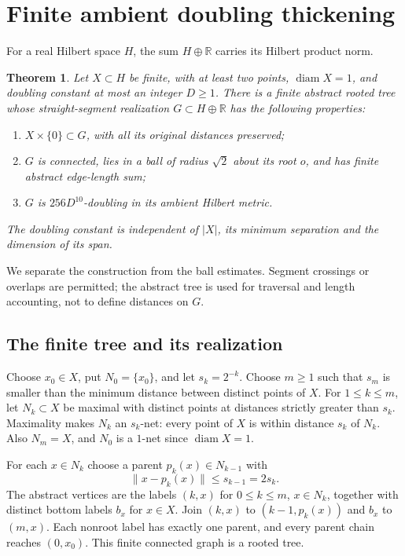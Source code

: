 \documentclass[11pt,a4paper]{article}
\newtheorem{theorem}{Theorem}[section]
\theoremstyle{definition}
\theoremstyle{remark}
\numberwithin{equation}{section}
\newcommand{\R}{\mathbb R}
\newcommand{\norm}[1]{\lVert #1\rVert}
\newcommand{\diam}{\operatorname{diam}}
\begin{document}
\section{Finite ambient doubling thickening}\label{sec:thickening}
For a real Hilbert space $H$, the sum $H\oplus\R$ carries its Hilbert product norm.
\begin{theorem}\label{thm:finite}
Let $X\subset H$ be finite, with at least two points, $\diam X=1$, and doubling constant at most an integer $D\ge1$. There is a finite abstract rooted tree whose straight-segment realization $G\subset H\oplus\R$ has the following properties:
\begin{enumerate}
\item $X\times\{0\}\subset G$, with all its original distances preserved;
\item $G$ is connected, lies in a ball of radius $\sqrt2$ about its root $o$, and has finite abstract edge-length sum;
\item $G$ is $256D^{10}$-doubling in its ambient Hilbert metric.
\end{enumerate}
The doubling constant is independent of $|X|$, its minimum separation and the dimension of its span.
\end{theorem}
We separate the construction from the ball estimates. Segment crossings or overlaps are permitted; the abstract tree is used for traversal and length accounting, not to define distances on $G$.

\subsection{The finite tree and its realization}
Choose $x_0\in X$, put $N_0=\{x_0\}$, and let $s_k=2^{-k}$. Choose $m\ge1$ such that $s_m$ is smaller than the minimum distance between distinct points of $X$. For $1\le k\le m$, let $N_k\subset X$ be maximal with distinct points at distances strictly greater than $s_k$. Maximality makes $N_k$ an $s_k$-net: every point of $X$ is within distance $s_k$ of $N_k$. Also $N_m=X$, and $N_0$ is a $1$-net since $\diam X=1$.

For each $x\in N_k$ choose a parent $p_k(x)\in N_{k-1}$ with
\begin{equation}\label{eq:parent}
 \norm{x-p_k(x)}\le s_{k-1}=2s_k.
\end{equation}
The abstract vertices are the labels $(k,x)$ for $0\le k\le m$, $x\in N_k$, together with distinct bottom labels $b_x$ for $x\in X$. Join $(k,x)$ to $(k-1,p_k(x))$ and $b_x$ to $(m,x)$. Each nonroot label has exactly one parent, and every parent chain reaches $(0,x_0)$. This finite connected graph is a rooted tree.
\end{document}
